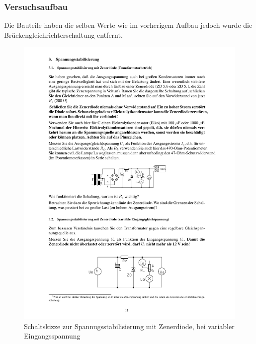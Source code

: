 \documentclass[12pt,a4paper]{article}
\begin{document}
\subsubsection{Versuchsaufbau}

Die Bauteile haben die selben Werte wie im vorherigem Aufbau jedoch wurde die Brückengleichrichterschaltung entfernt.

\begin{figure}[H] 
  \centering
    \includegraphics[trim = 10mm 30mm 10mm 213mm, clip, scale = 1]{ep2_14[Page11].pdf}
  	\caption[Schaltskizze zur Spannugsstabilisierung mit Zenerdiode, bei variabler Eingangsspannung]{Schaltskizze zur Spannugsstabilisierung mit Zenerdiode, bei variabler Eingangsspannung\footnotemark}
  \label{fig:2_9}
\end{figure}
\end{document}
